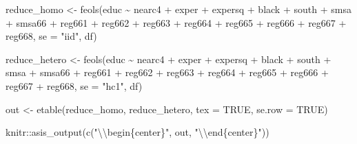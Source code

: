 \documentclass[
]{article}
\newenvironment{Shaded}{\begin{snugshade}}{\end{snugshade}}
\newcommand{\AttributeTok}[1]{\textcolor[rgb]{0.77,0.63,0.00}{#1}}
\newcommand{\ConstantTok}[1]{\textcolor[rgb]{0.00,0.00,0.00}{#1}}
\newcommand{\FunctionTok}[1]{\textcolor[rgb]{0.00,0.00,0.00}{#1}}
\newcommand{\NormalTok}[1]{#1}
\newcommand{\OtherTok}[1]{\textcolor[rgb]{0.56,0.35,0.01}{#1}}
\newcommand{\SpecialCharTok}[1]{\textcolor[rgb]{0.00,0.00,0.00}{#1}}
\newcommand{\StringTok}[1]{\textcolor[rgb]{0.31,0.60,0.02}{#1}}
\begin{document}
\begin{Shaded}
\begin{Highlighting}[]
\NormalTok{reduce\_homo }\OtherTok{\textless{}{-}} \FunctionTok{feols}\NormalTok{(educ }\SpecialCharTok{\textasciitilde{}}\NormalTok{ nearc4 }\SpecialCharTok{+}\NormalTok{ exper }\SpecialCharTok{+}\NormalTok{ expersq }\SpecialCharTok{+}\NormalTok{ black }\SpecialCharTok{+}\NormalTok{ south }\SpecialCharTok{+}\NormalTok{ smsa }\SpecialCharTok{+}\NormalTok{ smsa66 }\SpecialCharTok{+}
\NormalTok{                     reg661 }\SpecialCharTok{+}\NormalTok{ reg662 }\SpecialCharTok{+}\NormalTok{ reg663 }\SpecialCharTok{+}\NormalTok{ reg664 }\SpecialCharTok{+}\NormalTok{ reg665 }\SpecialCharTok{+}\NormalTok{ reg666 }\SpecialCharTok{+}\NormalTok{ reg667 }\SpecialCharTok{+}\NormalTok{ reg668,}
                     \AttributeTok{se =} \StringTok{"iid"}\NormalTok{, df)}

\NormalTok{reduce\_hetero }\OtherTok{\textless{}{-}} \FunctionTok{feols}\NormalTok{(educ }\SpecialCharTok{\textasciitilde{}}\NormalTok{ nearc4 }\SpecialCharTok{+}\NormalTok{ exper }\SpecialCharTok{+}\NormalTok{ expersq }\SpecialCharTok{+}\NormalTok{ black }\SpecialCharTok{+}\NormalTok{ south }\SpecialCharTok{+}\NormalTok{ smsa }\SpecialCharTok{+}\NormalTok{ smsa66 }\SpecialCharTok{+}
\NormalTok{                      reg661 }\SpecialCharTok{+}\NormalTok{ reg662 }\SpecialCharTok{+}\NormalTok{ reg663 }\SpecialCharTok{+}\NormalTok{ reg664 }\SpecialCharTok{+}\NormalTok{ reg665 }\SpecialCharTok{+}\NormalTok{ reg666 }\SpecialCharTok{+}\NormalTok{ reg667 }\SpecialCharTok{+}\NormalTok{ reg668,}
                      \AttributeTok{se =} \StringTok{"hc1"}\NormalTok{, df)}

\NormalTok{out }\OtherTok{\textless{}{-}} \FunctionTok{etable}\NormalTok{(reduce\_homo, reduce\_hetero, }\AttributeTok{tex =} \ConstantTok{TRUE}\NormalTok{, }\AttributeTok{se.row =} \ConstantTok{TRUE}\NormalTok{) }
\end{Highlighting}
\end{Shaded}

\begin{Shaded}
\begin{Highlighting}[]
\NormalTok{knitr}\SpecialCharTok{::}\FunctionTok{asis\_output}\NormalTok{(}\FunctionTok{c}\NormalTok{(}\StringTok{"}\SpecialCharTok{\textbackslash{}\textbackslash{}}\StringTok{begin\{center\}"}\NormalTok{, out, }\StringTok{"}\SpecialCharTok{\textbackslash{}\textbackslash{}}\StringTok{end\{center\}"}\NormalTok{)) }
\end{Highlighting}
\end{Shaded}
\end{document}
